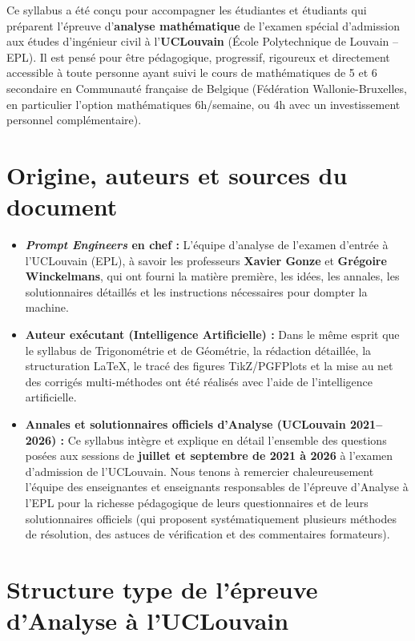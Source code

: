 \documentclass[11pt,a4paper,oneside]{book}
\begin{document}
Ce syllabus a été conçu pour accompagner les étudiantes et étudiants qui préparent l'épreuve d'\textbf{analyse mathématique} de l'examen spécial d'admission aux études d'ingénieur civil à l'\textbf{UCLouvain} (École Polytechnique de Louvain -- EPL). Il est pensé pour être pédagogique, progressif, rigoureux et directement accessible à toute personne ayant suivi le cours de mathématiques de 5\ieme{} et 6\ieme{} secondaire en Communauté française de Belgique (Fédération Wallonie-Bruxelles, en particulier l'option mathématiques 6h/semaine, ou 4h avec un investissement personnel complémentaire).

\section*{Origine, auteurs et sources du document}

\begin{theoreme}
\begin{itemize}
    \item \textbf{\emph{Prompt Engineers} en chef :} L'équipe d'analyse de l'examen d'entrée à l'UCLouvain (EPL), à savoir les professeurs \textbf{Xavier Gonze} et \textbf{Grégoire Winckelmans}, qui ont fourni la matière première, les idées, les annales, les solutionnaires détaillés et les instructions nécessaires pour dompter la machine.
    \item \textbf{Auteur exécutant (Intelligence Artificielle) :} Dans le même esprit que le syllabus de Trigonométrie et de Géométrie, la rédaction détaillée, la structuration \LaTeX{}, le tracé des figures TikZ/PGFPlots et la mise au net des corrigés multi-méthodes ont été réalisés avec l'aide de l'intelligence artificielle.
    \item \textbf{Annales et solutionnaires officiels d'Analyse (UCLouvain 2021--2026) :} Ce syllabus intègre et explique en détail l'ensemble des questions posées aux sessions de \textbf{juillet et septembre de 2021 à 2026} à l'examen d'admission de l'UCLouvain. Nous tenons à remercier chaleureusement l'équipe des enseignantes et enseignants responsables de l'épreuve d'Analyse à l'EPL pour la richesse pédagogique de leurs questionnaires et de leurs solutionnaires officiels (qui proposent systématiquement plusieurs méthodes de résolution, des astuces de vérification et des commentaires formateurs).
\end{itemize}
\end{theoreme}

\section*{Structure type de l'épreuve d'Analyse à l'UCLouvain}
\end{document}
